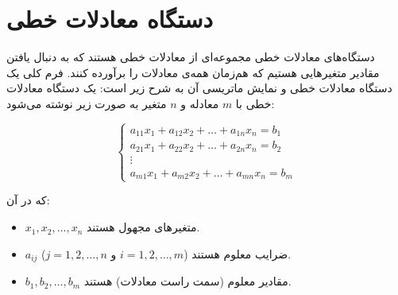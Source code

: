 \chapter{دستگاه معادلات خطی}
\begin{definition}
	دستگاه‌های معادلات خطی مجموعه‌ای از معادلات خطی هستند که به دنبال یافتن مقادیر متغیرهایی هستیم که هم‌زمان همه‌ی معادلات را برآورده کنند. فرم کلی یک دستگاه معادلات خطی و نمایش ماتریسی آن به شرح زیر است:
	یک دستگاه معادلات خطی با \( m \) معادله و \( n \) متغیر به صورت زیر نوشته می‌شود:
	
	\[
	\begin{cases}
		a_{11}x_1 + a_{12}x_2 + \dots + a_{1n}x_n = b_1 \\
		a_{21}x_1 + a_{22}x_2 + \dots + a_{2n}x_n = b_2 \\
		\vdots \\
		a_{m1}x_1 + a_{m2}x_2 + \dots + a_{mn}x_n = b_m
	\end{cases}
	\]
	
	که در آن:
	\begin{itemize}
		\item 
		\( x_1, x_2, \dots, x_n \) متغیرهای مجهول هستند.
		\item 
		\( a_{ij} \) ضرایب معلوم هستند (\( i = 1, 2, \dots, m \) و \( j = 1, 2, \dots, n \)).
		\item 
		\( b_1, b_2, \dots, b_m \) مقادیر معلوم (سمت راست معادلات) هستند.
	\end{itemize}

\end{definition}	

